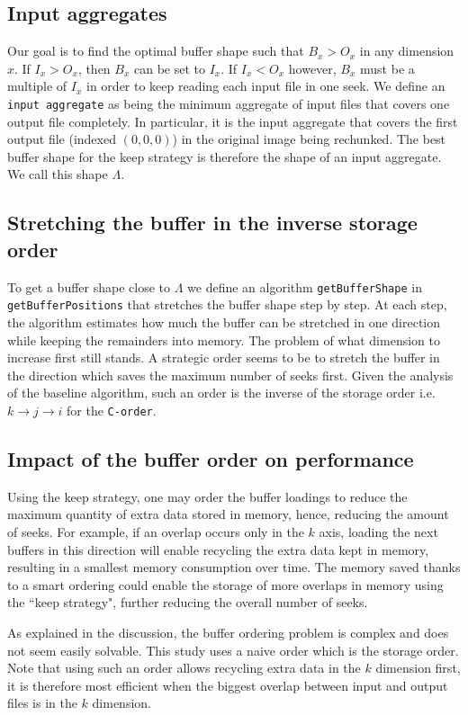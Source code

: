 \documentclass[conference]{IEEEtran}
\begin{document}
\subsection{Input aggregates}
Our goal is to find the optimal buffer shape such that $B_x>O_x$ in any dimension $x$.
If $I_x > O_x$, then $B_x$ can be set to $I_x$. If $I_x < O_x$ however, $B_x$
must be a multiple of $I_x$ in order to keep reading each input file in one seek.
We define an \texttt{input aggregate} as being the minimum aggregate of input files that
covers one output file completely. In particular, it is the input aggregate that
covers the first output file (indexed $(0,0,0)$) in the original image being
rechunked. The best buffer shape for the keep strategy is therefore the shape of
an input aggregate. We call this shape $\Lambda$.

\subsection{Stretching the buffer in the inverse storage order}
To get a buffer shape close to $\Lambda$ we define an algorithm
\texttt{getBufferShape} in \texttt{getBufferPositions} that stretches the
buffer shape step by step. At each step, the algorithm estimates how much the
buffer can be stretched in one direction while keeping the remainders into
memory. The problem of what dimension to increase first still stands. A
strategic order seems to be to stretch the buffer in the direction which saves
the maximum number of seeks first. Given the analysis of the baseline algorithm,
such an order is the inverse of the storage order i.e.
$k \rightarrow j \rightarrow i$ for the \texttt{C-order}.

\subsection{Impact of the buffer order on performance}
Using the keep strategy, one may order the buffer loadings to reduce the maximum
quantity of extra data stored in memory, hence, reducing the amount of seeks.
For example, if an overlap occurs only in the $k$ axis, loading the next buffers
in this direction will enable recycling the extra data kept in memory, resulting
in a smallest memory consumption over time. The memory saved thanks to a smart
ordering could enable the storage of more overlaps in memory using the
``keep strategy", further reducing the overall number of seeks.

As explained in the discussion, the buffer ordering problem is complex and does
not seem easily solvable.
This study uses a naive order which is the storage order. Note that using such
an order allows recycling extra data in the $k$ dimension first, it is therefore
most efficient when the biggest overlap between input and output files is in the
$k$ dimension.
\end{document}

